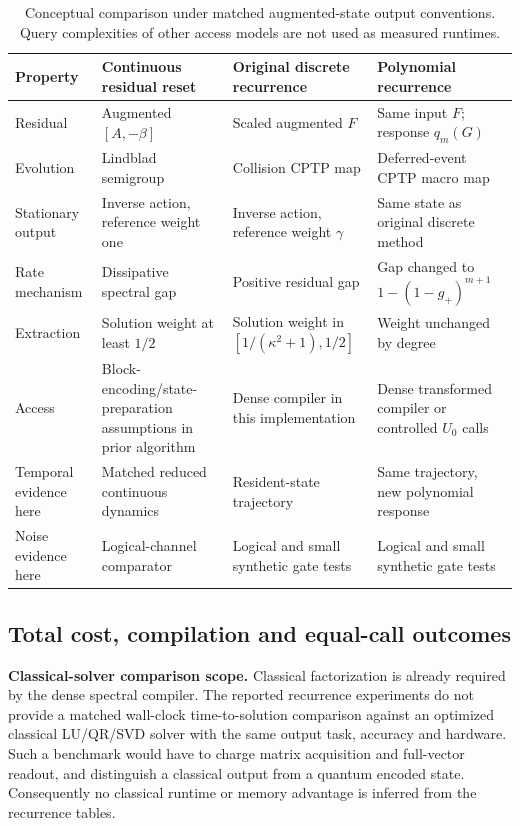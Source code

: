 \documentclass{ieeeaccess}
\begin{document}
\begin{table}[!tbp]\centering\caption{Conceptual comparison under matched augmented-state output conventions. Query complexities of other access models are not used as measured runtimes.}\label{tab:comparison}
\begin{tabular}{p{}p{}p{}p{}}\toprule
Property & Continuous residual reset & Original discrete recurrence & Polynomial recurrence\\\midrule
Residual & Augmented $[A,-\beta]$ & Scaled augmented $F$ & Same input $F$; response $q_m(G)$\\
Evolution & Lindblad semigroup & Collision CPTP map & Deferred-event CPTP macro map\\
Stationary output & Inverse action, reference weight one & Inverse action, reference weight $\gamma$ & Same state as original discrete method\\
Rate mechanism & Dissipative spectral gap & Positive residual gap & Gap changed to $1-(1-g_+)^{m+1}$\\
Extraction & Solution weight at least $1/2$ & Solution weight in $[1/(\kappa^2+1),1/2]$ & Weight unchanged by degree\\
Access & Block-encoding/state-preparation assumptions in prior algorithm & Dense compiler in this implementation & Dense transformed compiler or controlled $U_0$ calls\\
Temporal evidence here & Matched reduced continuous dynamics & Resident-state trajectory & Same trajectory, new polynomial response\\
Noise evidence here & Logical-channel comparator & Logical and small synthetic gate tests & Logical and small synthetic gate tests\\\bottomrule
\end{tabular}\end{table}

\subsection{Total cost, compilation and equal-call outcomes}
\noindent\textbf{Classical-solver comparison scope.} Classical factorization is already required by the dense spectral compiler. The reported recurrence experiments do not provide a matched wall-clock time-to-solution comparison against an optimized classical LU/QR/SVD solver with the same output task, accuracy and hardware. Such a benchmark would have to charge matrix acquisition and full-vector readout, and distinguish a classical output from a quantum encoded state. Consequently no classical runtime or memory advantage is inferred from the recurrence tables.
\end{document}
